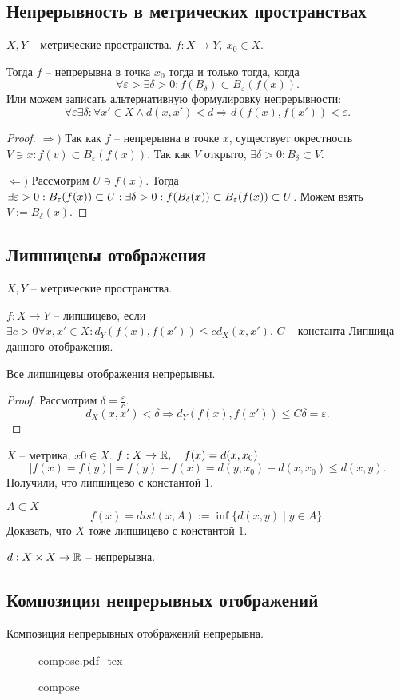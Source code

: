 \documentclass[12pt]{report}
\newcommand{\incfig}[1]{%
    \def\svgwidth{\columnwidth}
    {#1.pdf_tex}
}
\begin{document}
\subsection{Непрерывность в метрических пространствах}
\begin{thm}
    $X, Y$ -- метрические пространства.  $f: X \to  Y, ~ x_0 \in  X$.

    Тогда $f$ -- непрерывна в точка $x_0$ тогда и только тогда, когда 
    \[
	\forall  \varepsilon > \exists  \delta  >0: f(B_{ \delta }) \subset B_{ \varepsilon } (f(x))
    .\] 
    Или можем записать альтернативную формулировку непрерывности:
    \[
	\forall  \varepsilon  \exists \delta : \forall x' \in  X \wedge d(x, x') < d \Rightarrow  d(f(x) , f(x')) < \varepsilon 
    .\] 
\end{thm}
\begin{proof}
    $ \Rightarrow )$ Так как $f$ -- непрерывна в точке $x$, существует окрестность $V \ni x: f(v) \subset  B_{ \varepsilon }(f(x))$. Так как $V$ открыто, $\exists  \delta >0 : B_{ \delta } \subset  V$.

    $ \Leftarrow )$ Рассмотрим $U \ni f(x)$.
    Тогда $\exists  \varepsilon >0: B_{ \varepsilon }(f(x)) \subset U: \\
    \exists \delta  >0 : f(B_{\delta}(x)) \subset  B_{ \varepsilon } (f(x)) \subset  U$.
    Можем взять  $V:=B_{ \delta } (x)$.
\end{proof}
\subsection{Липшицевы отображения}
\begin{defn}
    $X, Y$ -- метрические пространства.

    $f: X \to  Y$ -- липшицево, если $\exists c > 0 \forall  x, x' \in  X: d_Y(f(x), f(x')) \le c d_X(x, x')$. $C$ -- константа Липшица данного отображения.
\end{defn}
\begin{cor}
    Все липшицевы отображения непрерывны.
\end{cor}
\begin{proof}
    Рассмотрим $ \delta = \frac{\varepsilon}{c}$. 
    \[
	d_X(x, x') < \delta  \Rightarrow d_Y(f(x), f(x')) \le C \delta = \varepsilon 
    .\] 
\end{proof}
\begin{ex}
    $X $ -- метрика, $x0 \in  X$.
    $f: X \to  \mathbb{R}, \quad f(x) = d(x, x_0)$
    \[
	|f(x) = f(y)| = f(y) - f(x) = d(y, x_0) - d(x, x_0) \le d(x, y)
    .\] 
    Получили, что липшицево с константой $1$.
\end{ex}
\begin{task}
    $A \subset  X$ 
    \[
	f(x) = dist(x, A) := \inf \{d(x, y) \mid y \in  A\}
    .\] 
    Доказать, что $X$ тоже липшицево с константой $1$.
\end{task}
\begin{ex}
    $d : X \times X \to  \mathbb{R}$ -- непрерывна.
\end{ex}
\subsection{Композиция непрерывных отображений}
\begin{thm}
    Композиция непрерывных отображений непрерывна.
\begin{figure}[ht]
    \centering
    \incfig{compose}
    \caption{compose}
    \label{fig:compose}
\end{figure}
\end{thm}
\end{document}
